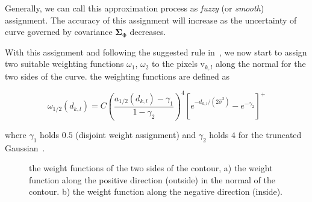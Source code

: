Generally, we can call this approximation process as \textit{fuzzy} (or \textit{smooth})
assignment. The accuracy of this assignment will increase as the
uncertainty of curve governed by covariance $\mathbf{\Sigma}_{\mathrm{\Phi}}$ decreases.

With this assignment and following the suggested rule in~\cite{hanek2004contracting}, we now start to assign two suitable weighting functions
$\omega_1$, $\omega_2$ to the pixels $\mathrm{v}_{k,l}$ along the
normal for the two sides of the curve. the weighting functions are
defined as

\begin{equation}
  \label{eq:weight}
  \omega_{1/2}(d_{k,l}) = C\left(\frac{a_{1/2}(d_{k,l}) -
    \gamma_1}{1-\gamma_2}\right)^4 \left[e^{-d_{k,l}/(2\hat{\sigma}^2)} - e^{-\gamma_2}\right]^+
\end{equation}


where $\gamma_1$ holds $0.5$ (disjoint weight assignment) and $\gamma_2$
holds $4$ for the truncated Gaussian~\cite{hanek2004contracting}. 

\begin{figure} 
  \begin{minipage}[t]{0.45\linewidth} 
    \centering 
  \end{minipage}%
  \begin{minipage}[t]{0.45\linewidth} 
    \centering 
  \end{minipage} 
\caption{the weight functions of the two sides of the contour, a) the
  weight function along the positive direction (outside) in the normal of the
  contour. b) the weight function along the negative direction (inside). }
\label{fig:weight}
\end{figure}


